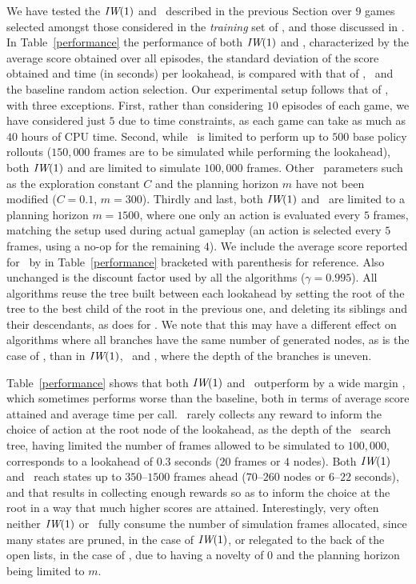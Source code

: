 We have tested the ${\textit{IW}}(1)$ and \BFS~described in the previous Section
over $9$ games selected amongst those considered in the \emph{training} set
of \cite{bellemare:jair2013}, and those discussed in \cite{deep-mind-atari}. 
In Table~\ref{performance} the performance of both ${\textit{IW}}(1)$ 
and \BFS, characterized by the average score obtained over all episodes, the standard deviation
of the score obtained and time (in seconds) per lookahead, is compared with that of \UCT, 
\BRFS~and the baseline random action selection. Our experimental 
setup  follows that of \cite{bellemare:jair2013}, with three exceptions. First, rather than
considering $10$ episodes of each game, we have considered just $5$
due to time constraints, as each game can take as much as $40$ hours of 
CPU time. Second, while \UCT~is limited to perform up to $500$ base policy rollouts ($150,000$ frames
are to be simulated while performing the lookahead), both ${\textit{IW}}(1)$ and \BFS are limited to
simulate $100,000$ frames. Other \UCT~parameters such as the exploration constant $C$ and
the planning horizon $m$ have not been modified ($C=0.1$, $m=300$). Thirdly and last, both ${\textit{IW}}(1)$ 
and \BFS~are limited to a planning horizon $m=1500$, where one only an action is evaluated every $5$ frames, matching
the setup used during actual gameplay (an action is selected every $5$ frames, using a no-op
for the remaining $4$). We include the average score reported for \UCT~by \cite{bellemare:jair2013} 
in Table~\ref{performance} bracketed with parenthesis for reference. Also unchanged is the discount factor
used by all the algorithms ($\gamma=0.995$). All algorithms reuse the tree built between each 
lookahead by setting the root of the tree to the best child of the root in the previous one,
and deleting its siblings and their descendants, as \cite{bellemare:jair2013} does for \UCT. We note that 
this may have a different effect on algorithms where all branches have the same number of
generated nodes, as is the case of \BRFS, than in ${\textit{IW}}(1)$, \BFS~and \UCT, where the depth of
the branches is uneven.

Table~\ref{performance} shows that both ${\textit{IW}}(1)$ and \BFS~outperform by a wide margin 
\BRFS, which sometimes performs worse than the baseline, both in terms of average score attained and 
average time per call. \BRFS~rarely collects any reward to inform the choice of action at
the root node of the lookahead, as the depth of the \BRFS~search tree, having limited the number of
frames allowed to be simulated to $100,000$, corresponds to a lookahead of $0.3$ seconds ($20$ 
frames or $4$ nodes). Both ${\textit{IW}}(1)$ and \BFS~reach states up to $350$--$1500$ frames ahead 
($70$--$260$ nodes or $6$--$22$ seconds), and that results in collecting enough rewards so as to
inform the choice at the root in a way that much higher scores are attained. Interestingly, very often
neither ${\textit{IW}}(1)$ or \BFS~fully consume the number of simulation frames allocated, since many
states are pruned, in the case of ${\textit{IW}}(1)$, or relegated to the back of the open lists, in the 
case of \BFS, due to having a novelty of $0$ and the planning horizon being limited to $m$. 

